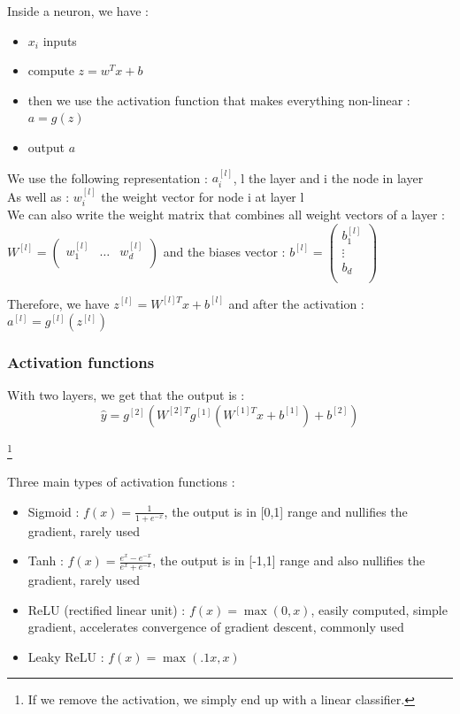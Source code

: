 \documentclass[../main.tex]{subfiles}
\begin{document}
Inside a neuron, we have : \begin{itemize}
    \item $x_i$ inputs\\
    \item compute $z = w^Tx+b$\\
    \item then we use the activation function that makes everything non-linear : $a = g(z)$\\
    \item output $a$\\
\end{itemize} 

We use the following representation : $a_i^{[l]}$, l the layer and i the node in layer\\
As well as : $w_i^{[l]}$ the weight vector for node i at layer l\\

We can also write the weight matrix that combines all weight vectors of a layer : $W^{[l]} = \begin{pmatrix}
    w_1^{[l]} & \dots & w_d^{[l]}\\
\end{pmatrix}$ and the biases vector : $b^{[l]} = \begin{pmatrix}
    b_1^{[l]}\\ \vdots \\ b_d\\
\end{pmatrix}$

Therefore, we have $z^{[l]} = W^{[l]T}x+ b^{[l]}$ and after the activation : $a^{[l]}= g^{[l]}(z^{[l]})$\\

\subsubsection{Activation functions}

With two layers, we get that the output is : \begin{equation}
    \hat{y} = g^{[2]} ( W^{[2]T} g^{[1]}(W^{[1]T}x+b^{[1]}) + b^{[2]})
\end{equation}

\footnote{If we remove the activation, we simply end up with a linear classifier.}

Three main types of activation functions : \begin{itemize}
    \item Sigmoid : $f(x) = \frac{1}{1+e^{-x}}$, the output is in [0,1] range and nullifies the gradient, rarely used\\
    \item Tanh : $f(x) = \frac{e^x-e^{-x}}{e^x + e^{-x}}$, the output is in [-1,1] range and also nullifies the gradient, rarely used\\
    \item ReLU (rectified linear unit) : $f(x) = \max(0,x)$, easily computed, simple gradient, accelerates convergence of gradient descent, commonly used\\
    \item Leaky ReLU : $f(x) = \max(.1x,x)$\\
\end{itemize}
\end{document}
